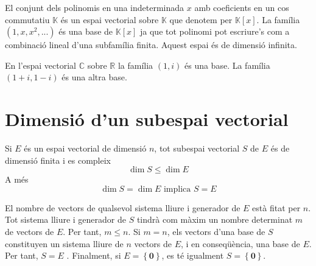 \begin{exemple}
El conjunt dels polinomis en una indeterminada $x$ amb coeficients en
un cos commutatiu $\mathbb{K}$ és un espai vectorial sobre $\mathbb{K}$
que denotem per $\mathbb{K}\left[ x\right] $. La família $(1,x,x^{2},...)$
és una base de $\mathbb{K}\left[ x\right] $ ja que tot polinomi pot
escriure's com a combinació lineal d’una subfamília finita. Aquest
espai és de dimensió infinita.
\end{exemple}

\begin{exemple}
En l’espai vectorial $\mathbb{C}$ sobre $\mathbb{R}$ la família $(1,i)$
és una base. La família $(1+i,1-i)$ és una altra base.
\end{exemple}

\section{Dimensió d’un subespai vectorial}

\begin{teorema}
Si $E$ és un espai vectorial de dimensió $n$, tot
subespai vectorial $S$ de $E$ és de dimensió finita
i es compleix%
\begin{equation*}
\dim S\leq \dim E
\end{equation*}%
A més%
\begin{equation*}
\dim S=\dim E\text{ \ \ \ implica \ \ }S=E
\end{equation*}

\end{teorema}
\begin{prova}
El nombre de vectors de qualsevol sistema lliure i generador de $E$ està fitat per $n$. Tot sistema lliure i generador de $S$
tindrà com màxim un nombre determinat $m$ de vectors de $%
E$. Per tant, $m\leq n$. Si $m=n$, els vectors d’una base de $%
S$ constituyen un sistema lliure de $n$ vectors de $E$, i
en conseqüència, una base de $E$. Per tant, $S=E$%
. Finalment, si $E=\left\{ \mathbf{0}\right\} $, es té
igualment $S=\left\{ \mathbf{0}\right\} $.
\end{prova}

